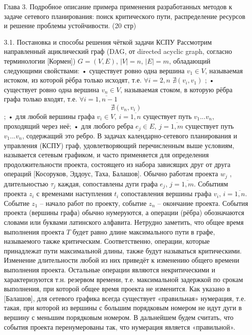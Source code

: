 Глава 3. Подробное описание примера применения разработанных методов к задаче сетевого планирования: поиск критического пути, распределение ресурсов и решение проблемы устойчивости. (20 стр)


3.1. Постановка и способы решения чёткой задачи КСПУ
Рассмотрим направленный ациклический граф (DAG, от directed acyclic graph, согласно терминологии [Кормен]) $G=(V,E)$, $\left| V \right|=n$, $\left| E \right|=m$, обладающий следующими свойствами:
•	существует ровно одна вершина ${{v}_{1}}\in V$, называемая истоком, из которой рёбра только исходят, т.е. $\forall i=2,n$ $\nexists \left( {{v}_{i}},{{v}_{1}} \right)$ ;
•	существует ровно одна вершина ${{v}_{n}}\in V$, называемая стоком, в которую рёбра графа только входят, т.е.  $\forall i=\overline{1,n-1}$\[\nexists \left( {{v}_{n}},{{v}_{i}} \right)\];
•	для любой вершины графа ${{v}_{i}}\in V,\ i=\overline{1,n}$ существует путь ${{v}_{1}}...{{v}_{n}}$, проходящий через неё;
•	для любого ребра ${{e}_{j}}\in E,\ j=\overline{1,m}$ существует путь ${{v}_{1}}...{{v}_{n}}$, содержащий это ребро.
В задачах календарно-сетевого планирования и управления (КСПУ) граф, удовлетворяющий перечисленным выше условиям, называется сетевым графиком, и часто применяется для определения продолжительности проекта, состоящего из набора зависящих друг от друга операций [Косоруков, Эддоус, Таха, Балашов]. Обычно работам проекта ${{w}_{j}}$ , длительностью $\tau_j$ каждая, сопоставлены дуги графа ${{e}_{j}}$, $j=\overline{1,m}$. Событиям проекта ${{z}_{i}}$ с временами наступления ${{t}_{i}}$ сопоставления вершины графа ${{v}_{i}}$, $i=\overline{1,n}$. Событие ${{z}_{1}}$ – начало работ по проекту, событие ${{z}_{n}}$ – окончание проекта. События проекта (вершины графа) обычно нумеруются, а операции (рёбра) обозначаются словами или буквами латинского алфавита.
Нетрудно заметить, что общее время выполнения проекта $T$ будет равно длине максимального пути в графе, называемого также критическим. Соответственно, операции, которые принадлежат пути максимальной длины, также будут называться критическими. Изменение длительности любой из них приведёт к изменению общего времени выполнения проекта. Остальные операции являются некритическими и характеризуются т.н. резервом времени, т.е. максимальной задержкой по срокам выполнения, при которой общее время проекта не изменится.
Как указано в [Балашов], для сетевого графика всегда существует «правильная» нумерация, т.е. такая, при которой из вершины с большим порядковым номером не идут дуги в вершину с меньшим порядковым номером. В дальнейшем будем считать, что события проекта перенумерованы так, что нумерация является «правильной».
